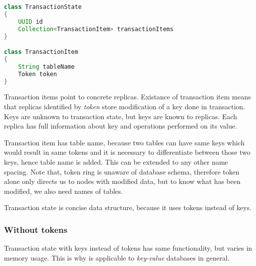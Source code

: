 \begin{lstlisting}[language=Java,style=outcode,label={lst:txState},caption={Transaction State data structure}]
class TransactionState
{
    UUID id
    Collection<TransactionItem> transactionItems    
}

class TransactionItem
{
    String tableName
    Token token
}
\end{lstlisting}






Transaction items point to concrete replicas. Existance of transaction item means that replicas identified by \emph{token} store modification of a key done in transaction. Keys are unknown to transaction state, but keys are known to replicas. Each replica has full information about key and operations performed on its value. 

Transaction item has table name, because two tables can have same keys which would result in same tokens and it is necessary to differentiate between those two keys, hence table name is added. This can be extended to any other name spacing. Note that, token ring is unaware of database schema, therefore token alone only directs us to nodes with modified data, but to know what has been modified, we also need names of tables.

 

Transaction state is concise data structure, because it uses tokens instead of keys. 

\subsubsection{Without tokens}
Transaction state with keys instead of tokens has same functionality, but varies in memory usage. This is why \mpp is applicable to \emph{key-value} databases in general.


